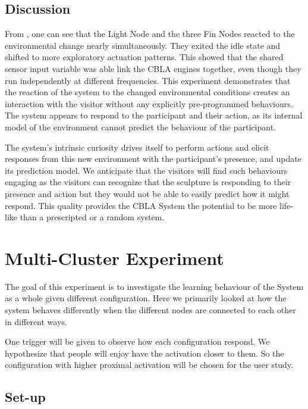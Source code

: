 \subsection{Discussion}

From , one can see that the Light Node and the three Fin Nodes reacted to the environmental change nearly simultaneously. They exited the idle state and shifted to more exploratory actuation patterns. This showed that the shared sensor input variable was able link the CBLA engines together, even though they run independently at different frequencies. This experiment demonstrates that the reaction of the system to the changed environmental conditions creates an interaction with the visitor without any explicitly pre-programmed behaviours. The system appears to respond to the participant and their action, as its internal model of the environment cannot predict the behaviour of the participant. 

The system's intrinsic curiosity drives itself to perform actions and elicit responses from this new environment with the participant's presence, and update its prediction model. We anticipate that the visitors will find such behaviours engaging as the visitors can recognize that the sculpture is responding to their presence and action but they would not be able to easily predict how it might respond. This quality provides the CBLA System the potential to be more life-like than a prescripted or a random system. 



\section{Multi-Cluster Experiment}

The goal of this experiment is to investigate the learning behaviour of the System as a whole given different configuration. Here we primarily looked at how the system behaves differently when the different nodes are connected to each other in different ways. 

One trigger will be given to observe how each configuration respond. We hypothesize that people will enjoy have the activation closer to them. So the configuration with higher proximal activation will be chosen for the user study. 

\subsection{Set-up} \label{sec:multi-cluster-setup}

